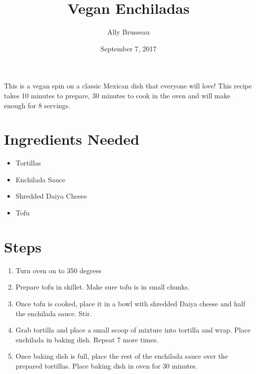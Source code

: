 \documentclass{article}
\title{Vegan Enchiladas}
\author{Ally Brusseau}
\date{September 7, 2017}
\begin{document}
\maketitle
\begin{center} This is a vegan spin on a classic Mexican dish that everyone will love! This recipe takes 10 minutes to prepare, 30 minutes to cook in the oven and will make enough for 8 servings.
\end{center}

\section*{Ingredients Needed}

\begin{itemize}

\item{Tortillas}

\item{Enchilada Sauce}

\item{Shredded Daiya Cheese}

\item{Tofu}
\end{itemize}

\section*{Steps}
\begin{enumerate}
\item{Turn oven on to 350 degrees}
\item{Prepare tofu in skillet. Make sure tofu is in small chunks.}
\item{Once tofu is cooked, place it in a bowl with shredded Daiya cheese and half the enchilada sauce. Stir.}
\item{Grab tortilla and place a small scoop of mixture into tortilla and wrap. Place enchilada in baking dish. Repeat 7 more times.}
\item{Once baking dish is full, place the rest of the enchilada sauce over the prepared tortillas. Place baking dish in oven for 30 minutes.}

\end{enumerate}
\end{document}
